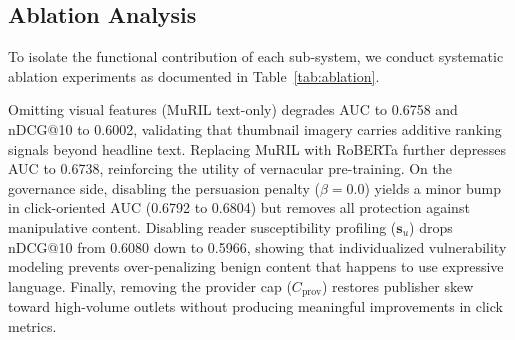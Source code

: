 \documentclass[conference]{IEEEtran}
\begin{document}
\subsection{Ablation Analysis}
To isolate the functional contribution of each sub-system, we conduct systematic ablation experiments as documented in Table~\ref{tab:ablation}. 

Omitting visual features (MuRIL text-only) degrades AUC to 0.6758 and nDCG@10 to 0.6002, validating that thumbnail imagery carries additive ranking signals beyond headline text. Replacing MuRIL with RoBERTa further depresses AUC to 0.6738, reinforcing the utility of vernacular pre-training. On the governance side, disabling the persuasion penalty ($\beta=0.0$) yields a minor bump in click-oriented AUC (0.6792 to 0.6804) but removes all protection against manipulative content. Disabling reader susceptibility profiling ($\mathbf{s}_u$) drops nDCG@10 from 0.6080 down to 0.5966, showing that individualized vulnerability modeling prevents over-penalizing benign content that happens to use expressive language. Finally, removing the provider cap ($C_{\text{prov}}$) restores publisher skew toward high-volume outlets without producing meaningful improvements in click metrics.

\begin{table}[t]
\caption{Ablation results on component contributions.}
\label{tab:ablation}
\centering
\small
{}
\end{table}
\end{document}
